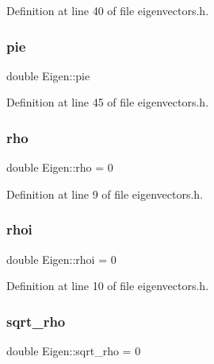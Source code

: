Definition at line 40 of file eigenvectors.\+h.

\mbox{\label{classEigen_a71253de919978058cd2b94e7834b019f}} 
\subsubsection{\texorpdfstring{pie}{pie}}
{\footnotesize\ttfamily double Eigen\+::pie\hspace{0.3cm}{\ttfamily [private]}}



Definition at line 45 of file eigenvectors.\+h.

\mbox{\label{classEigen_a646fa6580c8abd9d968e51645799e3bf}} 
\subsubsection{\texorpdfstring{rho}{rho}}
{\footnotesize\ttfamily double Eigen\+::rho = 0\hspace{0.3cm}{\ttfamily [private]}}



Definition at line 9 of file eigenvectors.\+h.

\mbox{\label{classEigen_a7e915698562002239d3c9cbd57d82334}} 
\subsubsection{\texorpdfstring{rhoi}{rhoi}}
{\footnotesize\ttfamily double Eigen\+::rhoi = 0\hspace{0.3cm}{\ttfamily [private]}}



Definition at line 10 of file eigenvectors.\+h.

\mbox{\label{classEigen_a3422990af7342f781822fe63ceecc2f4}} 
\subsubsection{\texorpdfstring{sqrt\+\_\+rho}{sqrt\_rho}}
{\footnotesize\ttfamily double Eigen\+::sqrt\+\_\+rho = 0\hspace{0.3cm}{\ttfamily [private]}}



